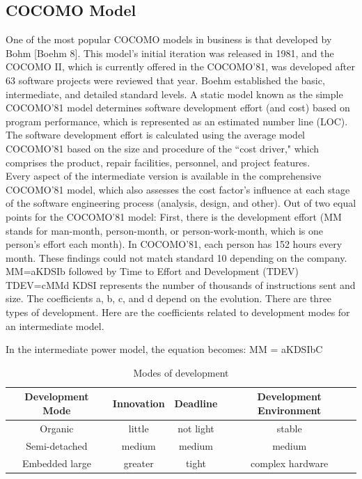 \documentclass[oneside,a4paper,12pt]{report}
\begin{document}
\subsection{COCOMO Model}
One of the most popular COCOMO models in business is that developed by Bohm [Boehm 8]. This model's initial iteration was released in 1981, and the COCOMO II, which is currently offered in the COCOMO'81, was developed after 63 software projects were reviewed that year. Boehm established the basic, intermediate, and detailed standard levels. A static model known as the simple COCOMO'81 model determines software development effort (and cost) based on program performance, which is represented as an estimated number line (LOC). The software development effort is calculated using the average model COCOMO'81 based on the size and procedure of the ``cost driver," which comprises the product, repair facilities, personnel, and project features.\\
Every aspect of the intermediate version is available in the comprehensive COCOMO'81 model, which also assesses the cost factor's influence at each stage of the software engineering process (analysis, design, and other). Out of two equal points for the COCOMO'81 model: First, there is the development effort (MM stands for man-month, person-month, or person-work-month, which is one person's effort each month). In COCOMO'81, each person has 152 hours every month. These findings could not match standard 10 depending on the company.\\
MM=aKDSIb
followed by Time to Effort and Development (TDEV) TDEV=cMMd
KDSI represents the number of thousands of instructions sent and size.
The coefficients a, b, c, and d depend on the evolution. There are three types of development. Here are the coefficients related to development modes for an intermediate model.

In the intermediate power model, the equation becomes: MM = aKDSIbC\\

\begin{table}[!htbp]
\begin{center}

\def\arraystretch{1.5}
  \begin{tabular}{| c | c |c |c |}
\hline
Development Mode &	Innovation & Deadline & Development Environment  \\
\hline
Organic & little & not light & stable\\
\hline
Semi-detached & medium & medium & medium\\
\hline
Embedded large & greater & tight & complex hardware\\
\hline 

\end{tabular}
 \caption {Modes of development }
 \label{tab:hreq}
\end{center}

\end{table}
\end{document}
